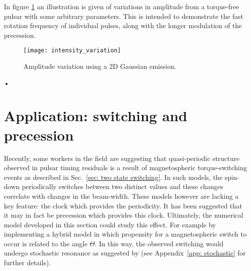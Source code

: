 \documentclass[../full_thesis/full_thesis.tex]{subfiles}
\begin{document}
In figure \ref{fig: amplitude variation} an illustration is given of variations
in amplitude from a torque-free pulsar with some arbitrary parameters. This is
intended to demonstrate the fast rotation frequency of individual pulses, along
with the longer modulation of the precession.
\begin{figure}[htb]
\centering
\texttt{[image: intensity\_variation]}
\caption{Amplitude variation using a 2D Gaussian emission.}
\label{fig: amplitude variation}
\end{figure}•


\section{Application: switching and precession}

Recently, some workers in the field \citep{Lyne2010, Perera2015} are suggesting
that quasi-periodic structure observed in pulsar timing residuals is a result
of magnetospheric torque-switching events as described in Sec.~\ref{sec: two
state switching}. In such models, the spin-down periodically switches between
two distinct values and these changes correlate with changes in the beam-width.
These models however are lacking a key feature: the clock which provides the
periodicity. It has been suggested \citep{Jones2012} that it may in fact be
precession which provides this clock. Ultimately, the numerical model developed
in this section could study this effect. For example by implementing a hybrid
model in which propensity for a magnetospheric switch to occur is related to
the angle $\Theta$. In this way, the observed switching would undergo
stochastic resonance as suggested by \citet{Cordes2013} (see Appendix~\ref{app:
stochastic} for further details).
\end{document}
